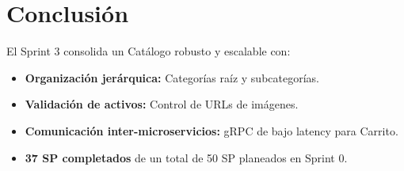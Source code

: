 \documentclass[12pt,a4paper]{article}
\begin{document}
\section{Conclusi\'on}

El Sprint 3 consolida un Cat\'alogo robusto y escalable con:
\begin{itemize}[leftmargin=1.5em]
  \item \textbf{Organizaci\'on jer\'arquica:} Categor\'ias raíz y subcategor\'ias.
  \item \textbf{Validaci\'on de activos:} Control de URLs de im\'agenes.
  \item \textbf{Comunicaci\'on inter-microservicios:} gRPC de bajo latency para Carrito.
  \item \textbf{37 SP completados} de un total de 50 SP planeados en Sprint 0.
\end{itemize}

\vspace{1.5cm}
\begin{center}
\end{center}
\end{document}
